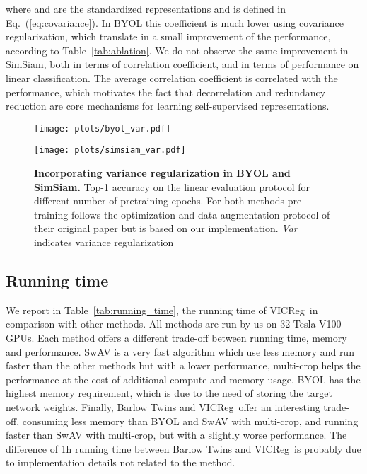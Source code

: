\documentclass{article}
\newcommand{\algo}{VICReg}
\begin{document}
where  and  are the standardized representations and  is defined in Eq.~(\ref{eq:covariance}). In BYOL this coefficient is much lower using covariance regularization, which translate in a small improvement of the performance, according to Table~\ref{tab:ablation}. We do not observe the same improvement in SimSiam, both in terms of correlation coefficient, and in terms of performance on linear classification. The average correlation coefficient is correlated with the performance, which motivates the fact that decorrelation and redundancy reduction are core mechanisms for learning self-supervised representations.

\begin{figure}
\hspace{-4em}
    \centering
    \begin{minipage}{0.38\textwidth}
        \centering
        \texttt{[image: plots/byol\_var.pdf]}
\end{minipage}\hspace{5em}
    \begin{minipage}{0.42\textwidth}
        \centering
        \texttt{[image: plots/simsiam\_var.pdf]}
    \end{minipage}
    \caption{\textbf{Incorporating variance regularization in BYOL and SimSiam.} Top-1 accuracy on the linear evaluation protocol for different number of pretraining epochs. For both methods pre-training follows the optimization and data augmentation protocol of their original paper but is based on our implementation. \textit{Var} indicates variance regularization}
    \label{fig:byol_simsiam_accuracy}
\end{figure}


\subsection{Running time} \label{app:running_time}

We report in Table~\ref{tab:running_time}, the running time of \algo \ in comparison with other methods. All methods are run by us on 32 Tesla V100 GPUs. Each method offers a different trade-off between running time, memory and performance. SwAV is a very fast algorithm which use less memory and run faster than the other methods but with a lower performance, multi-crop helps the performance at the cost of additional compute and memory usage. BYOL has the highest memory requirement, which is due to the need of storing the target network weights. Finally, Barlow Twins and \algo \ offer an interesting trade-off, consuming less memory than BYOL and SwAV with multi-crop, and running faster than SwAV with multi-crop, but with a slightly worse performance. The difference of 1h running time between Barlow Twins and \algo \ is probably due to implementation details not related to the method.
\end{document}

